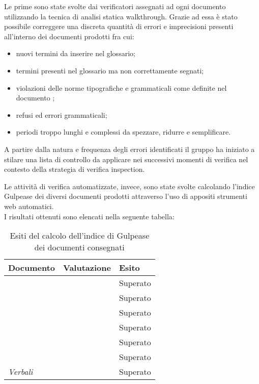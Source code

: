 		Le prime sono state svolte dai verificatori assegnati ad ogni documento utilizzando la tecnica di 					analisi statica walkthrough. Grazie ad essa è stato possibile correggere una discreta quantità di 					errori e imprecisioni presenti all'interno dei documenti prodotti fra cui: 
		\begin{itemize}	
			\item nuovi termini da inserire nel glossario;
			\item termini presenti nel glossario ma non correttamente segnati;
			\item violazioni delle norme tipografiche e grammaticali come definite nel documento \NdP ;
			\item refusi ed errori grammaticali;
			\item periodi troppo lunghi e complessi da spezzare, ridurre e semplificare.
		\end{itemize}
		A partire dalla natura e frequenza degli errori identificati il gruppo ha iniziato a stilare una lista
		di controllo da applicare nei successivi momenti di verifica nel contesto della strategia di verifica
		inspection.

		Le attività di verifica automatizzate, invece, sono state svolte calcolando l'indice Gulpease dei 	
		diversi documenti prodotti attraverso l'uso di appositi strumenti web automatici. 
		\\I risultati ottenuti sono elencati nella seguente tabella:
		\begin{table}[h]
		\begin{tabular}{|l|l|l|}
		\hline
		\textbf{Documento} 		&\textbf{Valutazione} &\textbf{Esito} \\
		\hline
		\PdQ 					&		&Superato\\
		\NdP 					&		&Superato\\
		\SdF 					&		&Superato\\	
		\AdR 					&		&Superato\\
		\PdQ 					&		&Superato\\
		\Glossario 				&		&Superato\\
		\textit{Verbali} 		&		&Superato\\
		\hline
		\end{tabular}
		\caption{Esiti del calcolo dell'indice di Gulpease dei documenti consegnati}
		\end{table}
		
